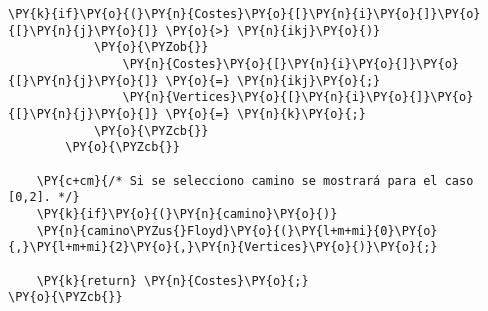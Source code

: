\begin{Verbatim}[commandchars=\\\{\}]
		    \PY{k}{if}\PY{o}{(}\PY{n}{Costes}\PY{o}{[}\PY{n}{i}\PY{o}{]}\PY{o}{[}\PY{n}{j}\PY{o}{]} \PY{o}{>} \PY{n}{ikj}\PY{o}{)}
			\PY{o}{\PYZob{}}
			    \PY{n}{Costes}\PY{o}{[}\PY{n}{i}\PY{o}{]}\PY{o}{[}\PY{n}{j}\PY{o}{]} \PY{o}{=} \PY{n}{ikj}\PY{o}{;}
			    \PY{n}{Vertices}\PY{o}{[}\PY{n}{i}\PY{o}{]}\PY{o}{[}\PY{n}{j}\PY{o}{]} \PY{o}{=} \PY{n}{k}\PY{o}{;}
			\PY{o}{\PYZcb{}}
		\PY{o}{\PYZcb{}}

    \PY{c+cm}{/* Si se selecciono camino se mostrará para el caso [0,2]. */}
    \PY{k}{if}\PY{o}{(}\PY{n}{camino}\PY{o}{)}
	\PY{n}{camino\PYZus{}Floyd}\PY{o}{(}\PY{l+m+mi}{0}\PY{o}{,}\PY{l+m+mi}{2}\PY{o}{,}\PY{n}{Vertices}\PY{o}{)}\PY{o}{;}

    \PY{k}{return} \PY{n}{Costes}\PY{o}{;}
\PY{o}{\PYZcb{}}
\end{Verbatim}
